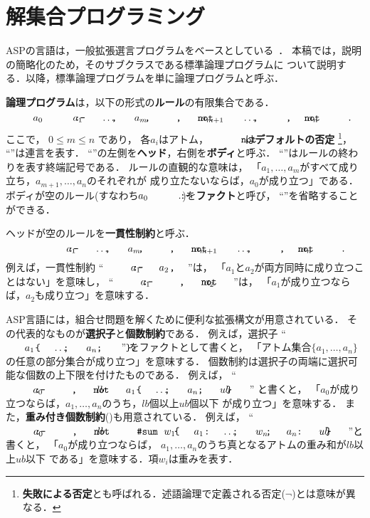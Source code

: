 ﻿\section{解集合プログラミング}\label{chap:asp}

ASPの言語は，一般拡張選言プログラムをベースとしている~\cite{Inoue08:jssst}．
本稿では，説明の簡略化のため，そのサブクラスである標準論理プログラムに
ついて説明する．以降，標準論理プログラムを単に論理プログラムと呼ぶ．

\textbf{論理プログラム}は，以下の形式の\textbf{ルール}の有限集合である．
\begin{equation}
 \label{eq:rule}\nonumber
  a_0 ~\mcode{:-}~ a_1 \mcode{,} \dots \mcode{,} a_m \mcode{,}~%
  \naf{a_{m+1}} \mcode{,} \dots \mcode{,} \naf{a_n}\mcode{.}
\end{equation}
ここで，
$0\leq m\leq n$ であり，
各$a_i$はアトム，
$\naf{}$は\textbf{デフォルトの否定}
\footnote{\textbf{失敗による否定}とも呼ばれる．述語論理で定義される否定($\neg$)とは意味が異なる．}，
``\mcode{,}''は連言を表す．
``\mcode{:-}''の左側を\textbf{ヘッド}，右側を\textbf{ボディ}と呼ぶ．
``''はルールの終わりを表す終端記号である．
ルールの直観的な意味は，
「$a_1,\ldots,a_m$がすべて成り立ち，$a_{m+1},\ldots,a_n$のそれぞれが
成り立たないならば，$a_0$が成り立つ」である．
ボディが空のルール(すなわち\(a_0~\mcode{:-}~.\))を\textbf{ファクト}と呼び，
``\mcode{:-}''を省略することができる．

ヘッドが空のルールを\textbf{一貫性制約}と呼ぶ．
\begin{equation}
  \label{eq:constr}\nonumber
  \mcode{:-}~ a_1 \mcode{,} \dots \mcode{,} a_m \mcode{,}~%
  \naf{a_{m+1}} \mcode{,} \dots \mcode{,} \naf{a_n}\mcode{.}
\end{equation}
例えば，一貫性制約
``\(\mcode{:-}~ a_1 \mcode{,} a_2 \mcode{.}\)''は，
「$a_1$と$a_2$が両方同時に成り立つことはない」を意味し，
``\(\mcode{:-}~ a_1 \mcode{,}~\naf{a_{2}} \mcode{.}\)''は，
「$a_1$が成り立つならば，$a_2$も成り立つ」を意味する．

ASP言語には，組合せ問題を解くために便利な拡張構文が用意されている．
その代表的なものが\textbf{選択子}と\textbf{個数制約}である．
例えば，選択子
``\(\mcode{\{}a_1\mcode{;}\dots\mcode{;}a_n\mcode{\}.}\)''
をファクトとして書くと，
「アトム集合\(\{a_1,\dots,a_n\}\)の任意の部分集合が成り立つ」を意味する．
個数制約は選択子の両端に選択可能な個数の上下限を付けたものである．
例えば，
``\(\mcode{:-}~a_{0}\mcode{,}~\naf{lb\ \mcode{\{}a_1\mcode{;}\dots\mcode{;}a_n\mcode{\}}\ ub\mcode{.}}\)''
と書くと，
「$a_{0}$が成り立つならば，$a_1,\dots,a_n$のうち，$lb$個以上$ub$個以下
が成り立つ」を意味する．
また，\textbf{重み付き個数制約}()も用意されている．
例えば，
``\(\mcode{:-}~a_{0}\mcode{,}~\naf{lb\ \mcode{\#sum}~%
\mcode{\{}w_{1}\mcode{:}a_{1}\mcode{;} \dots \mcode{;}w_{n}\mcode{:}a_{n}\mcode{\}}\ ub}\mcode{.}\)''と書くと，
「$a_{0}$が成り立つならば，
$a_1,\dots,a_n$のうち真となるアトムの重み和が$lb$以上$ub$以下
である」を意味する．項$w_{i}$は重みを表す．

